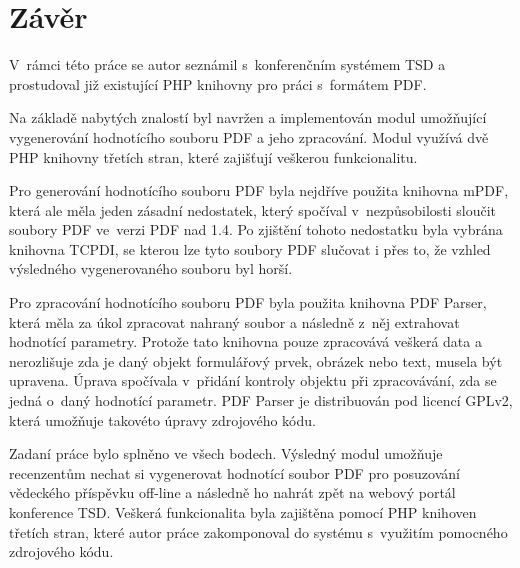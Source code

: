 \chapter{Závěr}
 V~rámci této práce se autor seznámil s~konferenčním systémem TSD a prostudoval již existující PHP knihovny pro práci s~formátem PDF.
\par
Na základě nabytých znalostí byl navržen a implementován modul umožňující vygenerování hodnotícího souboru PDF a jeho zpracování. Modul využívá dvě PHP knihovny třetích stran, které zajišťují veškerou funkcionalitu. 
\par
Pro generování hodnotícího souboru PDF byla nejdříve použita knihovna mPDF, která ale měla jeden zásadní nedostatek, který spočíval v~nezpůsobilosti sloučit soubory PDF ve~verzi PDF nad 1.4. Po zjištění tohoto nedostatku byla vybrána knihovna TCPDI, se kterou lze tyto soubory PDF slučovat i přes to, že vzhled výsledného vygenerovaného souboru byl horší.
\par
Pro zpracování hodnotícího souboru PDF byla použita knihovna PDF Parser, která měla za úkol zpracovat nahraný soubor a následně z~něj extrahovat hodnotící parametry. Protože tato knihovna pouze zpracovává veškerá data a nerozlišuje zda je daný objekt formulářový prvek, obrázek nebo text, musela být upravena. Úprava spočívala v~přidání kontroly objektu při zpracovávání, zda se jedná o~daný hodnotící parametr. PDF Parser je distribuován pod licencí GPLv2, která umožňuje takovéto úpravy zdrojového kódu.
\par
Zadaní práce bylo splněno ve všech bodech. Výsledný modul umožňuje recenzentům nechat si vygenerovat hodnotící soubor PDF pro posuzování vědeckého příspěvku off-line a následně ho nahrát zpět na webový portál konference TSD. Veškerá funkcionalita byla zajištěna pomocí PHP knihoven třetích stran, které autor práce zakomponoval do systému s~využitím pomocného zdrojového kódu.